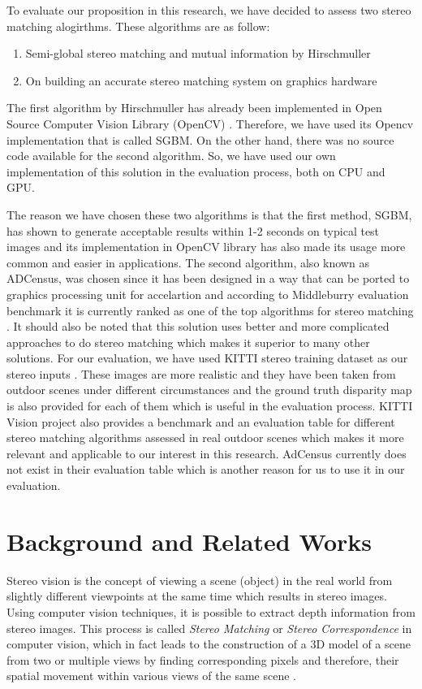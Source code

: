 \documentclass[dvips,letterpaper,12pt]{report}
\begin{document}
To evaluate our proposition in this research, we have decided to assess two stereo matching alogirthms. These algorithms are as follow:
\begin{enumerate}
\item Semi-global stereo matching and mutual information by Hirschmuller \cite{hir08}
\item On building an accurate stereo matching system on graphics hardware \cite{mei11}
\end{enumerate}

The first algorithm by Hirschmuller has already been implemented in Open Source Computer Vision Library (OpenCV) \cite{sgbm}. Therefore, we have used its Opencv implementation that is 
called SGBM. On the other hand, there was no source code available for the second algorithm. So, we have used our own implementation of this solution in the evaluation process, both on CPU and GPU.

The reason we have chosen these two algorithms is that the first method, SGBM, has shown to generate acceptable results within 1-2 seconds on typical test images \cite{hir08} and 
its implementation in OpenCV library has also made its usage more common and easier in applications. The second algorithm, also known as ADCensus, was chosen since it has been designed in a way that
can be ported to graphics processing unit for accelartion and according to Middleburry evaluation benchmark it is currently ranked as one of the top algorithms for stereo matching \cite{mideval}.
It should also be noted that this solution uses better and more complicated approaches to do stereo matching which makes it superior to many other solutions. \newline
For our evaluation, we have used KITTI stereo training dataset as our stereo inputs \cite{kitti}. 
These images are more realistic and they have been taken from outdoor scenes under different circumstances 
and the ground truth disparity map is also provided for each of them which is useful in the evaluation process. KITTI Vision project also provides a benchmark and an evaluation table
for different stereo
matching algorithms assessed in real outdoor scenes which makes it more relevant and applicable to our interest in this research. 
AdCensus currently does not exist in their evaluation table which is another reason for us to use it in our evaluation.


\chapter{Background and Related Works}
Stereo vision is the concept of viewing a scene (object) in the real world from slightly different
viewpoints at the same time which results in stereo images. Using computer vision techniques, it is possible to extract depth information from stereo
images. This process is called {\it Stereo Matching} or {\it Stereo Correspondence} in computer vision,
which in fact leads to the construction of a
3D model of a scene from two or multiple views by finding corresponding pixels and therefore, their spatial movement within various views of the same scene \cite{sze11}.
\end{document}
